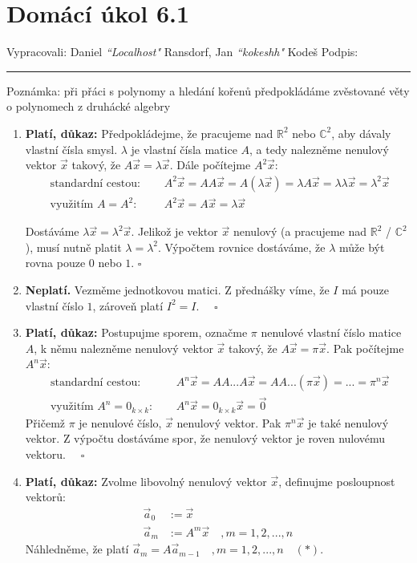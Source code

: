 \documentclass[12pt]{article}
\begin{document}
\section*{Domácí úkol 6.1}

Vypracovali: Daniel \textit{``Localhost"} Ransdorf, Jan \textit{``kokeshh"} Kodeš \hfill Podpis: \rule{4cm}{0.4pt}


\bigskip

Poznámka: při přáci s polynomy a hledání kořenů předpokládáme zvěstované věty o polynomech z druhácké algebry

\renewcommand{\theenumi}{\alph{enumi}}
\begin{enumerate}
  \item \textbf{Platí, důkaz:} Předpokládejme, že pracujeme nad $\mathbb{R}^2$ nebo $\mathbb{C}^2$, aby
    dávaly vlastní čísla smysl. $\lambda$ je vlastní čísla matice $A$, a tedy nalezněme nenulový vektor $\vec{x}$
    takový, že $A\vec{x} = \lambda\vec{x}$.
    Dále počítejme $A^2\vec{x}$:
    \begin{align*}
      \text{ standardní cestou: } \quad &A^2\vec{x} = AA\vec{x} = A(\lambda\vec{x}) = \lambda A\vec{x} = \lambda\lambda\vec{x} = \lambda^2\vec{x}\\
      \text{ využitím }A=A^2\text{: } \quad &A^2\vec{x} = A\vec{x} = \lambda\vec{x}
    \end{align*}

    Dostáváme $\lambda\vec{x} = \lambda^2\vec{x}$. Jelikož je vektor $\vec{x}$ nenulový (a pracujeme nad $\mathbb{R}^2$ / $\mathbb{C}^2$),
    musí nutně platit $\lambda = \lambda^2$. Výpočtem rovnice dostáváme, že $\lambda$ může být rovna pouze $0$ nebo $1$.
    \quad $\square$
  \item \textbf{Neplatí.} Vezměme jednotkovou matici. Z přednášky víme, že $I$ má pouze vlastní číslo $1$, zároveň platí $I^2 = I$. $\quad\square$
  \item \textbf{Platí, důkaz:} Postupujme sporem, označme $\pi$ nenulové vlastní číslo matice $A$, k němu
    nalezněme nenulový vektor $\vec{x}$ takový, že $A\vec{x} = \pi\vec{x}$.
    Pak počítejme $A^n\vec{x}$:
    \begin{align*}
      \text{ standardní cestou: } \quad &A^n\vec{x} = AA...A\vec{x} = AA...(\pi\vec{x}) = ... = \pi^n\vec{x}   \\
      \text{ využitím }A^n=0_{k\times k}\text{: } \quad &A^n\vec{x} = 0_{k\times k}\vec{x} = \vec{0}
    \end{align*}
    Přičemž $\pi$ je nenulové číslo, $\vec{x}$ nenulový vektor. Pak $\pi^n\vec{x}$ je také nenulový vektor.
    Z výpočtu dostáváme spor, že nenulový vektor je roven nulovému vektoru. $\quad \square$
  \item \textbf{Platí, důkaz:} Zvolme libovolný nenulový vektor $\vec{x}$, definujme posloupnost vektorů:
    \begin{align*}
      \vec{a}_0 &:= \vec{x} \\
      \vec{a}_m &:= A^m\vec{x} \quad, m=1,2,...,n
    \end{align*}
    Náhledněme, že platí $\vec{a}_m = A\vec{a}_{m-1} \quad, m=1,2,...,n \quad (*)$.


\end{enumerate}
\end{document}
